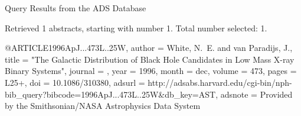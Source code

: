 Query Results from the ADS Database


Retrieved 1 abstracts, starting with number 1.  Total number selected: 1.

@ARTICLE{1996ApJ...473L..25W,
   author = {{White}, N.~E. and {van Paradijs}, J.},
    title = "{The Galactic Distribution of Black Hole Candidates in Low Mass X-ray Binary Systems}",
  journal = {\apjl},
     year = 1996,
    month = dec,
   volume = 473,
    pages = {L25+},
      doi = {10.1086/310380},
   adsurl = {http://adsabs.harvard.edu/cgi-bin/nph-bib_query?bibcode=1996ApJ...473L..25W&db_key=AST},
  adsnote = {Provided by the Smithsonian/NASA Astrophysics Data System}
}


